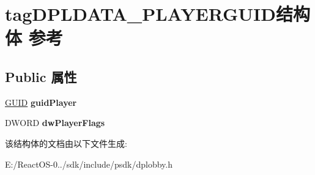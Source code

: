 \hypertarget{structtag_d_p_l_d_a_t_a___p_l_a_y_e_r_g_u_i_d}{}\section{tag\+D\+P\+L\+D\+A\+T\+A\+\_\+\+P\+L\+A\+Y\+E\+R\+G\+U\+I\+D结构体 参考}
\label{structtag_d_p_l_d_a_t_a___p_l_a_y_e_r_g_u_i_d}
\subsection*{Public 属性}
\begin{DoxyCompactItemize}
\item 
\mbox{\label{structtag_d_p_l_d_a_t_a___p_l_a_y_e_r_g_u_i_d_a9cb94676299970815f3c322532dffe87}} 
\hyperlink{interface_g_u_i_d}{G\+U\+ID} {\bfseries guid\+Player}
\item 
\mbox{\label{structtag_d_p_l_d_a_t_a___p_l_a_y_e_r_g_u_i_d_a69a5dad27090018286d866335633d49a}} 
D\+W\+O\+RD {\bfseries dw\+Player\+Flags}
\end{DoxyCompactItemize}


该结构体的文档由以下文件生成\+:\begin{DoxyCompactItemize}
\item 
E\+:/\+React\+O\+S-\/0../sdk/include/psdk/dplobby.\+h\end{DoxyCompactItemize}
